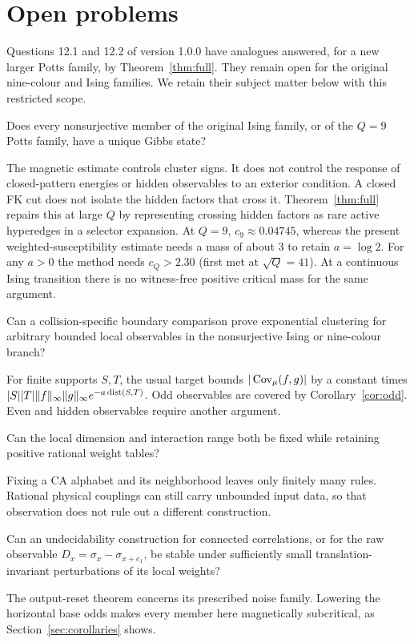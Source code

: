 \section{Open problems}\label{sec:open}
Questions 12.1 and 12.2 of version 1.0.0 have analogues answered, for a new larger Potts family, by Theorem~\ref{thm:full}. They remain open for the original nine-colour and Ising families. We retain their subject matter below with this restricted scope.

\begin{question}
Does every nonsurjective member of the original Ising family, or of the $Q=9$ Potts family, have a unique Gibbs state?
\end{question}
The magnetic estimate controls cluster signs. It does not control the response of closed-pattern energies or hidden observables to an exterior condition. A closed FK cut does not isolate the hidden factors that cross it. Theorem~\ref{thm:full} repairs this at large $Q$ by representing crossing hidden factors as rare active hyperedges in a selector expansion. At $Q=9$, $c_9\approx0.04745$, whereas the present weighted-susceptibility estimate needs a mass of about $3$ to retain $a=\log2$. For any $a>0$ the method needs $c_Q>2.30$ (first met at $\sqrt Q=41$). At a continuous Ising transition there is no witness-free positive critical mass for the same argument.

\begin{question}
Can a collision-specific boundary comparison prove exponential clustering for arbitrary bounded local observables in the nonsurjective Ising or nine-colour branch?
\end{question}
For finite supports $S,T$, the usual target bounds $|\operatorname{Cov}_\mu(f,g)|$ by a constant times $|S||T|\|f\|_\infty\|g\|_\infty e^{-a\operatorname{dist}(S,T)}$. Odd observables are covered by Corollary~\ref{cor:odd}. Even and hidden observables require another argument.

\begin{question}
Can the local dimension and interaction range both be fixed while retaining positive rational weight tables?
\end{question}
Fixing a CA alphabet and its neighborhood leaves only finitely many rules. Rational physical couplings can still carry unbounded input data, so that observation does not rule out a different construction.

\begin{question}[Perturbations]
Can an undecidability construction for connected correlations, or for the raw observable $D_x=\sigma_x-\sigma_{x+e_1}$, be stable under sufficiently small translation-invariant perturbations of its local weights?
\end{question}
The output-reset theorem concerns its prescribed noise family. Lowering the horizontal base odds makes every member here magnetically subcritical, as Section~\ref{sec:corollaries} shows.

